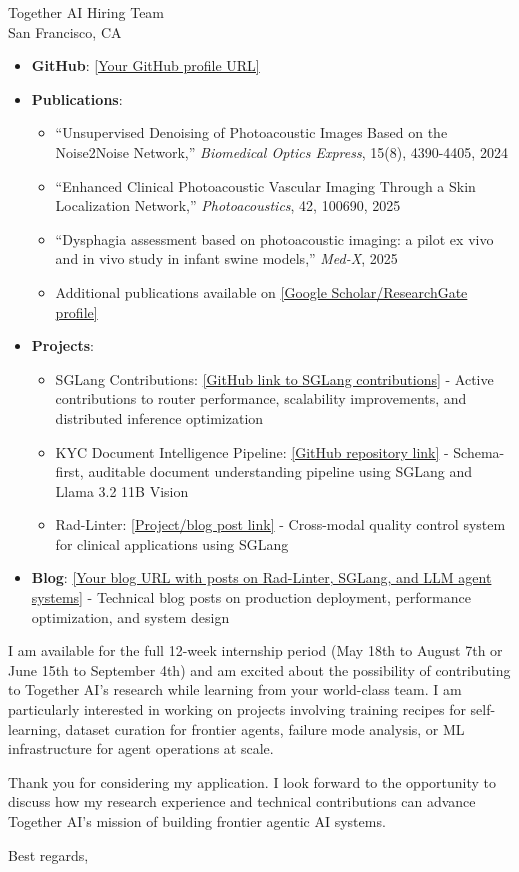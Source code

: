 \documentclass[11pt,a4paper]{letter}
\begin{document}
\begin{letter}{Together AI Hiring Team \\ San Francisco, CA}
\begin{itemize}
\item \textbf{GitHub}: \url{[Your GitHub profile URL]}
\item \textbf{Publications}: 
  \begin{itemize}
  \item ``Unsupervised Denoising of Photoacoustic Images Based on the Noise2Noise Network,'' \textit{Biomedical Optics Express}, 15(8), 4390-4405, 2024
  \item ``Enhanced Clinical Photoacoustic Vascular Imaging Through a Skin Localization Network,'' \textit{Photoacoustics}, 42, 100690, 2025
  \item ``Dysphagia assessment based on photoacoustic imaging: a pilot ex vivo and in vivo study in infant swine models,'' \textit{Med-X}, 2025
  \item Additional publications available on \url{[Google Scholar/ResearchGate profile]}
  \end{itemize}
\item \textbf{Projects}:
  \begin{itemize}
  \item SGLang Contributions: \url{[GitHub link to SGLang contributions]} - Active contributions to router performance, scalability improvements, and distributed inference optimization
  \item KYC Document Intelligence Pipeline: \url{[GitHub repository link]} - Schema-first, auditable document understanding pipeline using SGLang and Llama 3.2 11B Vision
  \item Rad-Linter: \url{[Project/blog post link]} - Cross-modal quality control system for clinical applications using SGLang
  \end{itemize}
\item \textbf{Blog}: \url{[Your blog URL with posts on Rad-Linter, SGLang, and LLM agent systems]} - Technical blog posts on production deployment, performance optimization, and system design
\end{itemize}

I am available for the full 12-week internship period (May 18th to August 7th or June 15th to September 4th) and am excited about the possibility of contributing to Together AI's research while learning from your world-class team. I am particularly interested in working on projects involving training recipes for self-learning, dataset curation for frontier agents, failure mode analysis, or ML infrastructure for agent operations at scale.

Thank you for considering my application. I look forward to the opportunity to discuss how my research experience and technical contributions can advance Together AI's mission of building frontier agentic AI systems.

\closing{Best regards,}

\end{letter}
\end{document}
